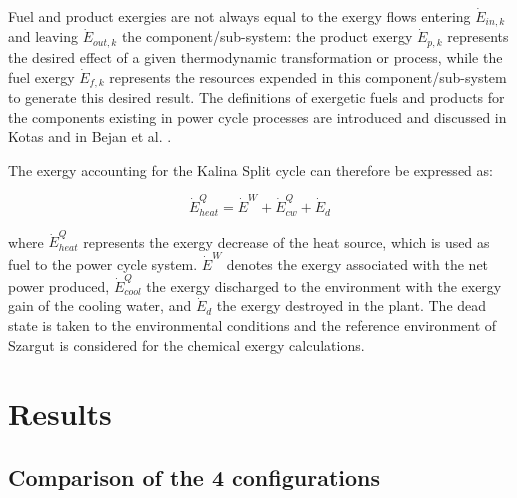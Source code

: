 \documentclass[final,times,3p]{elsarticle}
\begin{document}
\begin{itemize}
	Fuel and product exergies are not always equal to the exergy flows entering $\dot{E}_{in,k}$ and leaving $\dot{E}_{out,k}$ the component/sub-system: the product exergy $\dot{E}_{p,k}$ represents the desired effect of a given thermodynamic transformation or process, while the fuel exergy $\dot{E}_{f,k}$ represents the resources expended in this component/sub-system to generate this desired result. The definitions of exergetic fuels and products for the components existing in power cycle processes are introduced and discussed in Kotas \cite{Kotas1980,Kotas1980a,Kotas1995} and in Bejan et al. \cite{BejanAdrian;TsatsaronisGeorge;Moran1996}. 

	\end{itemize}
	

	The exergy accounting for the Kalina Split cycle can therefore be expressed as:

	\begin{equation}
		\dot{E}^{Q}_{heat}=\dot{E}^{W}+\dot{E}^{Q}_{cw}+\dot{E}_{d}
	\end{equation}

	where $\dot{E}^{Q}_{heat}$ represents the exergy decrease of the heat source, which is used as fuel to the power cycle system. $\dot{E}^{W}$ denotes the exergy associated with the net power produced, $\dot{E}^{Q}_{cool}$ the exergy discharged to the environment with the exergy gain of the cooling water, and $\dot{E}_{d}$ the exergy destroyed in the plant. The dead state is taken to the environmental conditions and the reference environment of Szargut \cite{Szargut1998} is considered for the chemical exergy calculations.
	

		

\section{Results}
\label{sec:results}

\subsection{Comparison of the 4 configurations}
\end{document}

